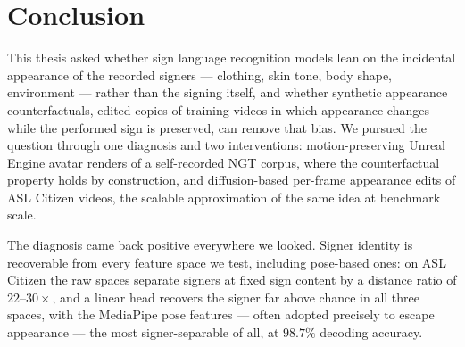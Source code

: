 \chapter{Conclusion}
This thesis asked whether sign language recognition models lean on the
incidental appearance of the recorded signers --- clothing, skin tone,
body shape, environment --- rather than the signing itself, and whether
synthetic appearance counterfactuals, edited copies of training videos in
which appearance changes while the performed sign is preserved, can
remove that bias. We pursued the question through one diagnosis and two
interventions: motion-preserving Unreal Engine avatar renders of a
self-recorded NGT corpus, where the counterfactual property holds by
construction, and diffusion-based per-frame appearance edits of ASL
Citizen videos, the scalable approximation of the same idea at benchmark
scale.

The diagnosis came back positive everywhere we looked. Signer identity is
recoverable from every feature space we test, including pose-based ones:
on ASL Citizen the raw spaces separate signers at fixed sign content by a
distance ratio of $22$--$30\times$, and a linear head recovers the signer
far above chance in all three spaces, with the MediaPipe pose features
--- often adopted precisely to escape appearance --- the most
signer-separable of all, at $98.7\%$ decoding accuracy.

